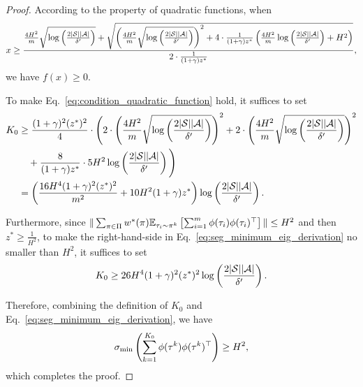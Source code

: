 \begin{proof}
	According to the property of quadratic functions, when
	\begin{align}
		x \geq \frac{ \frac{4H^2}{m} \sqrt{\log\left( \frac{2|\mathcal{S}||\mathcal{A}|}{\delta'} \right)} + \sqrt{ \left(  \frac{4H^2}{m} \sqrt{\log\left( \frac{2|\mathcal{S}||\mathcal{A}|}{\delta'} \right)}  \right)^2 + 4 \cdot \frac{ 1 }{(1+\gamma) z^*} \left( \frac{4H^2}{m} \log\left( \frac{2|\mathcal{S}||\mathcal{A}|}{\delta'} \right) + H^2  \right) } }{ 2 \cdot \frac{ 1 }{(1+\gamma) z^*} } , \label{eq:condition_quadratic_function}
	\end{align} 
	we have $f(x)\geq0$.
	
	To make Eq.~\eqref{eq:condition_quadratic_function} hold, it suffices to set 
	\begin{align*}
		K_0 &\geq \frac{(1+\gamma)^2 (z^*)^2 }{4} \cdot \Bigg( 2 \cdot \left( \frac{4H^2}{m}\sqrt{\log\left( \frac{2|\mathcal{S}||\mathcal{A}|}{\delta'} \right)} \right)^2 + 2 \cdot \left(  \frac{4H^2}{m}\sqrt{\log\left( \frac{2|\mathcal{S}||\mathcal{A}|}{\delta'} \right)}  \right)^2 \\&\quad +  \frac{8  }{(1+\gamma) z^*} \cdot 5H^2 \log\left( \frac{2|\mathcal{S}||\mathcal{A}|}{\delta'} \right)   \Bigg)
		\\
		&=  \left(  \frac{ 16H^4 (1+\gamma)^2 (z^*)^2 }{m^2 } + 10 H^2 (1+\gamma) z^*  \right) \log\left( \frac{2|\mathcal{S}||\mathcal{A}|}{\delta'} \right) .
	\end{align*}
	
	Furthermore, since $\|\sum_{\pi \in \Pi} w^*(\pi)  \mathbb{E}_{\tau_i \sim \pi^k}\left[ \sum_{i=1}^{m} \phi(\tau_i) \phi(\tau_i)^\top \right]\| \leq H^2$ and then $z^* \geq \frac{1}{H^2}$, to make the right-hand-side in Eq.~\eqref{eq:seg_minimum_eig_derivation} no smaller than $H^2$, it suffices to set
	\begin{align*}
		K_0 \geq 26H^4 (1+\gamma)^2 (z^*)^2  \log\left( \frac{2|\mathcal{S}||\mathcal{A}|}{\delta'} \right) .
	\end{align*}
	
	Therefore, combining the definition of $K_0$ and Eq.~\eqref{eq:seg_minimum_eig_derivation}, we have
	\begin{align*}
		\sigma_{\min}\left(  \sum_{k=1}^{K_0} \phi(\tau^k) \phi(\tau^k)^\top  \right) \geq H^2 ,
	\end{align*}
	which completes the proof.
\end{proof}	


